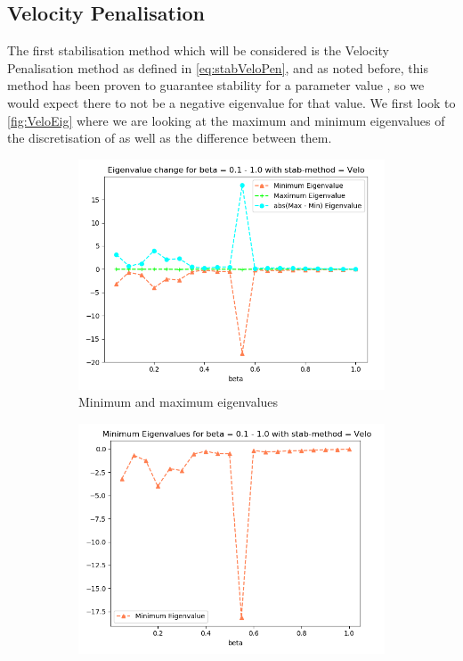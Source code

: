 \subsection{Velocity Penalisation}
The first stabilisation method which will be considered is the Velocity Penalisation method as defined in \autoref{eq:stabVeloPen}, and as noted before, this method has been proven to guarantee stability for a parameter value , so we would expect there to not be a negative eigenvalue for that \mbeta value. We first look to \autoref{fig:VeloEig} where we are looking at the maximum and minimum eigenvalues of the discretisation of  as well as the difference between them.
\begin{figure}[ht]
     \centering
     \begin{subfigure}[h]{0.49\textwidth}
        \centering
        \includegraphics[width=\textwidth]{latex/Thesis/media/Beta_1_thru_0_velo.png}
        \caption{Minimum and maximum eigenvalues\label{fig:VeloEig}}
     \end{subfigure}
     \hfill
     \begin{subfigure}[h]{0.49\textwidth}
        \centering
        \includegraphics[width=\textwidth]{latex/Thesis/media/Beta_1_thru_0_velo_min.png}

\end{subfigure}
\end{figure}
